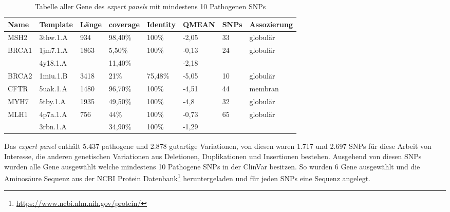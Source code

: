 \begin{table}[]
    \centering
    \begin{tabular}{llllllll}
    \hline
    \multicolumn{1}{|l|}{Name} & \multicolumn{1}{l|}{Template} & \multicolumn{1}{l|}{Länge} & \multicolumn{1}{l|}{coverage} & \multicolumn{1}{l|}{Identity} & \multicolumn{1}{l|}{QMEAN} & \multicolumn{1}{l|}{SNPs} & \multicolumn{1}{l|}{Assozierung} \\ \hline
    \rowcolor[HTML]{9AFF99} 
    MSH2 & 3thw.1.A & 934 & 98,40\% & 100\% & -2,05 & 33 & globulär \\ \hline
    \multicolumn{1}{|l}{BRCA1} & 1jm7.1.A & 1863 & 5,50\% & 100\% & -0,13 & 24 & \multicolumn{1}{l|}{globulär} \\
    \multicolumn{1}{|l}{} & 4y18.1.A &  & 11,40\% &  & -2,18 &  & \multicolumn{1}{l|}{} \\ \hline
    BRCA2 & 1miu.1.B & 3418 & 21\% & 75,48\% & -5,05 & 10 & globulär \\
    \rowcolor[HTML]{9AFF99} 
    CFTR & 5uak.1.A & 1480 & 96,70\% & 100\% & -4,51 & 44 & membran \\
    MYH7 & 5tby.1.A & 1935 & 49,50\% & 100\% & -4,8 & 32 & globulär \\ \hline
    \multicolumn{1}{|l}{MLH1} & 4p7a.1.A & 756 & 44\% & 100\% & -0,73 & 65 & \multicolumn{1}{l|}{globulär} \\
    \multicolumn{1}{|l}{} & 3rbn.1.A &  & 34,90\% & 100\% & -1,29 &  & \multicolumn{1}{l|}{} \\ \hline
    \end{tabular}
    \caption{Tabelle aller Gene des \emph{expert panels} mit mindestens 10 Pathogenen \ac{SNPs}}
    \label{tab:expert_snps}
\end{table}

Das \emph{expert panel} enthält 5.437 pathogene und 2.878 gutartige Variationen, von diesen waren 1.717 und 2.697 \ac{SNPs} für diese Arbeit von Interesse, die anderen genetischen Variationen aus Deletionen, Duplikationen und Insertionen bestehen. Ausgehend von diesen \ac{SNPs} wurden alle Gene ausgewählt welche mindestens 10 Pathogene SNPs in der ClinVar besitzen. So wurden 6 Gene ausgewählt und die Aminosäure Sequenz aus der NCBI Protein Datenbank\footnote{\url{https://www.ncbi.nlm.nih.gov/protein/}} heruntergeladen und für jeden \ac{SNPs} eine Sequenz angelegt. 

